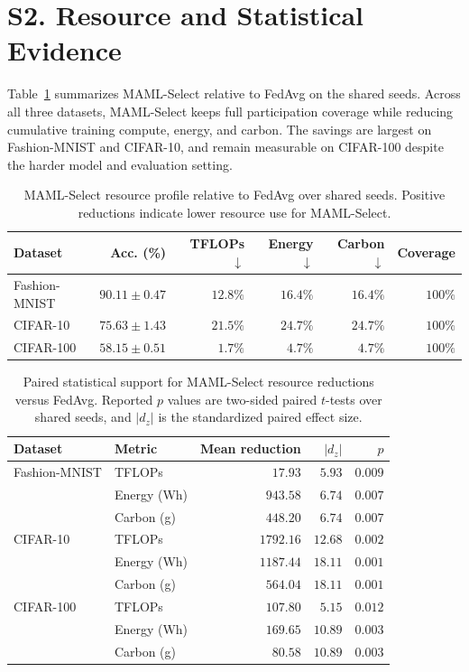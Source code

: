 \documentclass[10pt]{article}
\begin{document}
\section*{S2. Resource and Statistical Evidence}

Table~\ref{tab:supp_reductions} summarizes MAML-Select relative to FedAvg on the shared seeds.  Across all three datasets, MAML-Select keeps full participation coverage while reducing cumulative training compute, energy, and carbon.  The savings are largest on Fashion-MNIST and CIFAR-10, and remain measurable on CIFAR-100 despite the harder model and evaluation setting.

\begin{table}[!ht]
\centering
\caption{MAML-Select resource profile relative to FedAvg over shared seeds.  Positive reductions indicate lower resource use for MAML-Select.}
\label{tab:supp_reductions}
\small
\begin{tabular}{@{}lrrrrr@{}}
\toprule
Dataset & Acc. (\%) & TFLOPs $\downarrow$ & Energy $\downarrow$ & Carbon $\downarrow$ & Coverage \\
\midrule
Fashion-MNIST & $90.11 \pm 0.47$ & $12.8\%$ & $16.4\%$ & $16.4\%$ & $100\%$ \\
CIFAR-10 & $75.63 \pm 1.43$ & $21.5\%$ & $24.7\%$ & $24.7\%$ & $100\%$ \\
CIFAR-100 & $58.15 \pm 0.51$ & $1.7\%$ & $4.7\%$ & $4.7\%$ & $100\%$ \\
\bottomrule
\end{tabular}
\end{table}

\begin{table}[!ht]
\centering
\caption{Paired statistical support for MAML-Select resource reductions versus FedAvg.  Reported $p$ values are two-sided paired $t$-tests over shared seeds, and $|d_z|$ is the standardized paired effect size.}
\label{tab:supp_stats}
\small
\begin{tabular}{@{}llrrr@{}}
\toprule
Dataset & Metric & Mean reduction & $|d_z|$ & $p$ \\
\midrule
Fashion-MNIST & TFLOPs & $17.93$ & $5.93$ & $0.009$ \\
 & Energy (Wh) & $943.58$ & $6.74$ & $0.007$ \\
 & Carbon (g) & $448.20$ & $6.74$ & $0.007$ \\
\midrule
CIFAR-10 & TFLOPs & $1792.16$ & $12.68$ & $0.002$ \\
 & Energy (Wh) & $1187.44$ & $18.11$ & $0.001$ \\
 & Carbon (g) & $564.04$ & $18.11$ & $0.001$ \\
\midrule
CIFAR-100 & TFLOPs & $107.80$ & $5.15$ & $0.012$ \\
 & Energy (Wh) & $169.65$ & $10.89$ & $0.003$ \\
 & Carbon (g) & $80.58$ & $10.89$ & $0.003$ \\
\bottomrule
\end{tabular}
\end{table}
\end{document}

